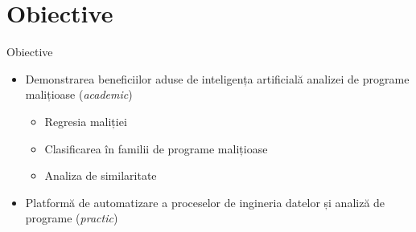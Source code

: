 \section{Obiective}

\begin{frame}{Obiective} \pause
	\begin{itemize}
		\item Demonstrarea beneficiilor aduse de inteligența artificială analizei de programe malițioase (\textit{academic}) \pause
		    \begin{itemize}
		        \item Regresia maliției \pause
		        \item Clasificarea în familii de programe malițioase \pause
		        \item Analiza de similaritate \pause
	        \end{itemize}
		\item Platformă de automatizare a proceselor de ingineria datelor și analiză de programe (\textit{practic})
	\end{itemize}
\end{frame}